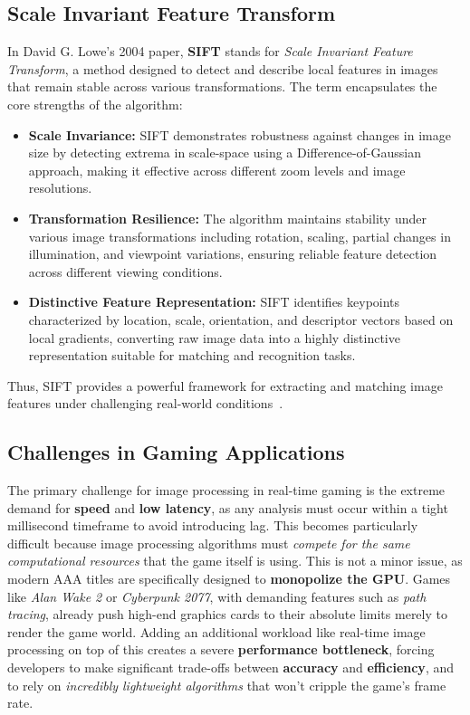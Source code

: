 \subsection{Scale Invariant Feature Transform}
In David G. Lowe’s 2004 paper, \textbf{SIFT} stands for \textit{Scale Invariant Feature Transform}, a method designed to detect and describe local features in images that remain stable across various transformations. The term encapsulates the core strengths of the algorithm:
\begin{itemize}
    \item \textbf{Scale Invariance:} SIFT demonstrates robustness against changes in image size by detecting extrema in scale-space using a Difference-of-Gaussian approach, making it effective across different zoom levels and image resolutions.
    
    \item \textbf{Transformation Resilience:} The algorithm maintains stability under various image transformations including rotation, scaling, partial changes in illumination, and viewpoint variations, ensuring reliable feature detection across different viewing conditions.
    
    \item \textbf{Distinctive Feature Representation:} SIFT identifies keypoints characterized by location, scale, orientation, and descriptor vectors based on local gradients, converting raw image data into a highly distinctive representation suitable for matching and recognition tasks.
\end{itemize}
Thus, SIFT provides a powerful framework for extracting and matching image features under challenging real-world conditions~\cite{lowe2004}.

\subsection{Challenges in Gaming Applications}
The primary challenge for image processing in real-time gaming is the extreme demand for \textbf{speed} and \textbf{low latency}, as any analysis must occur within a tight millisecond timeframe to avoid introducing lag. This becomes particularly difficult because image processing algorithms must \textit{compete for the same computational resources} that the game itself is using. This is not a minor issue, as modern AAA titles are specifically designed to \textbf{monopolize the GPU}. Games like \textit{Alan Wake 2} or \textit{Cyberpunk 2077}, with demanding features such as \textit{path tracing}, already push high-end graphics cards to their absolute limits merely to render the game world. Adding an additional workload like real-time image processing on top of this creates a severe \textbf{performance bottleneck}, forcing developers to make significant trade-offs between \textbf{accuracy} and \textbf{efficiency}, and to rely on \textit{incredibly lightweight algorithms} that won't cripple the game's frame rate.

